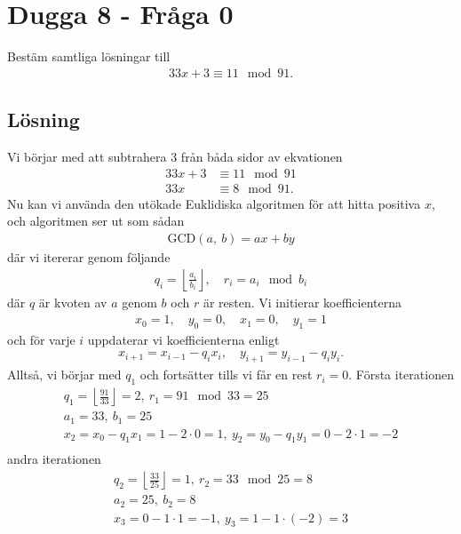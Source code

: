 \documentclass[a4paper,12pt]{article}
\begin{document}
%
\section*{Dugga 8 - Fråga 0}
Bestäm samtliga lösningar till
\begin{align*}
    33x + 3 \equiv 11 \mod{91}.
\end{align*}
\subsection*{Lösning}
Vi börjar med att subtrahera 3 från båda sidor av ekvationen
\begin{align}
    33x + 3 &\equiv 11 \mod{91} \\
    33x &\equiv 8 \mod{91}. \label{eq1}
\end{align}
Nu kan vi använda den utökade Euklidiska algoritmen för att hitta positiva $x$,
och algoritmen ser ut som sådan
\begin{align}
    \text{GCD}(a,~b) = ax + by
\end{align}
där vi itererar genom följande
\begin{align}
    q_i = \left\lfloor \frac{a_i}{b_i} \right\rfloor, \quad r_i = a_i \mod{b_i}
\end{align}
där $q$ är kvoten av $a$ genom $b$ och $r$ är resten. Vi initierar koefficienterna
\begin{align}
    x_0 = 1, \quad y_0 = 0, \quad x_1 = 0, \quad y_1 = 1
\end{align}
och för varje $i$ uppdaterar vi koefficienterna enligt
\begin{align}
    x_{i+1} = x_{i-1} - q_ix_i, \quad y_{i+1} = y_{i-1} - q_iy_i.
\end{align}
Alltså, vi börjar med $q_1$ och fortsätter tills vi får en rest $r_i = 0$.
Första iterationen
\begin{gather}
    q_1 = \left\lfloor \frac{91}{33} \right\rfloor = 2,~r_1 = 91 \mod 33 = 25 \\
    a_1 = 33,~b_1 = 25 \\
    x_2 = x_0 - q_1x_1 = 1 - 2 \cdot 0 = 1,~y_2 = y_0 - q_1y_1 = 0 - 2 \cdot 1 = -2 \\
\end{gather}
andra iterationen
\begin{gather}
    q_2 = \left\lfloor \frac{33}{25} \right\rfloor = 1,~r_2 = 33 \mod 25 = 8 \\
    a_2 = 25,~b_2 = 8 \\
    x_3 = 0 - 1 \cdot 1 = -1,~y_3 = 1 - 1 \cdot (-2) = 3
\end{gather}
\end{document}

